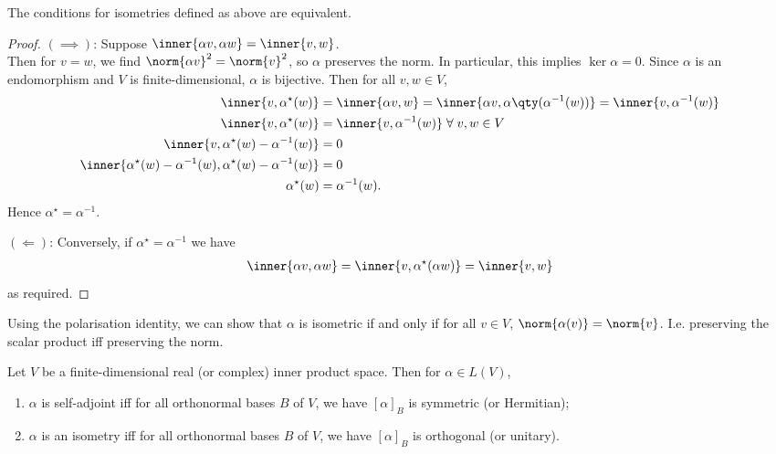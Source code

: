 \begin{proposition}
	The conditions for isometries defined as above are equivalent.
\end{proposition}

\begin{proof}
	$(\implies)$: Suppose $\inner{\alpha v, \alpha w} = \inner{v,w}$. \\
	Then for $v = w$, we find $\norm{\alpha v}^2 = \norm{v}^2$, so $\alpha$ preserves the norm.
	In particular, this implies $\ker \alpha = \qty{0}$.
	Since $\alpha$ is an endomorphism and $V$ is finite-dimensional, $\alpha$ is bijective.
	Then for all $v, w \in V$,
	\begin{align*}
		\inner{v, \alpha^\star(w)} &= \inner{\alpha v, w} = \inner{\alpha v, \alpha\qty(\alpha^{-1}(w))} = \inner{v, \alpha^{-1}(w)} \\
		\inner{v, \alpha^\star(w)} &= \inner{v, \alpha^{-1}(w)} \; \forall \; v, w \in V \\
		\inner{v, \alpha^\star(w) - \alpha^{-1}(w)} &= 0 \\
		\inner{\alpha^\star(w) - \alpha^{-1}(w), \alpha^\star(w) - \alpha^{-1}(w)} &= 0 \\
		\alpha^\star(w) &= \alpha^{-1}(w).
	\end{align*}
	Hence $\alpha^\star = \alpha^{-1}$.

	$(\Longleftarrow)$: Conversely, if $\alpha^\star = \alpha^{-1}$ we have
	\begin{align*}
		\inner{\alpha v, \alpha w} = \inner{v, \alpha^\star(\alpha w)} = \inner{v, w}
	\end{align*}
	as required.
\end{proof}

\begin{remark}
	Using the polarisation identity, we can show that $\alpha$ is isometric if and only if for all $v \in V$, $\norm{\alpha(v)} = \norm{v}$.
	I.e. preserving the scalar product iff preserving the norm.
\end{remark}

\begin{lemma}
	Let $V$ be a finite-dimensional real (or complex) inner product space.
	Then for $\alpha \in L(V)$,
	\begin{enumerate}
		\item $\alpha$ is self-adjoint iff for all orthonormal bases $B$ of $V$, we have $[\alpha]_B$ is symmetric (or Hermitian);
		\item $\alpha$ is an isometry iff for all orthonormal bases $B$ of $V$, we have $[\alpha]_B$ is orthogonal (or unitary).
	\end{enumerate}
\end{lemma}

